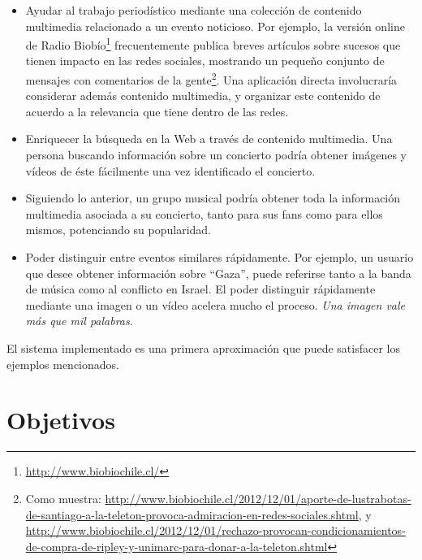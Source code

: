 \documentclass[upright, contnum]{umemoria}
\begin{document}
\begin{itemize}
\item Ayudar al trabajo periodístico mediante una colección de
     contenido multimedia relacionado a un evento noticioso. Por
     ejemplo, la versión online de Radio
     Biobío\footnote{\href{http://www.biobiochile.cl/}{http://www.biobiochile.cl/} } frecuentemente publica
     breves artículos sobre sucesos que tienen impacto en las redes
     sociales, mostrando un pequeño conjunto de mensajes con
     comentarios de la gente\footnote{Como muestra: \href{http://www.biobiochile.cl/2012/12/01/aporte-de-lustrabotas-de-santiago-a-la-teleton-provoca-admiracion-en-redes-sociales.shtml}{http://www.biobiochile.cl/2012/12/01/aporte-de-lustrabotas-de-santiago-a-la-teleton-provoca-admiracion-en-redes-sociales.shtml}, y \href{http://www.biobiochile.cl/2012/12/01/rechazo-provocan-condicionamientos-de-compra-de-ripley-y-unimarc-para-donar-a-la-teleton.shtml}{http://www.biobiochile.cl/2012/12/01/rechazo-provocan-condicionamientos-de-compra-de-ripley-y-unimarc-para-donar-a-la-teleton.shtml} }. 
     Una aplicación directa involucraría
     considerar además contenido multimedia, y organizar este
     contenido de acuerdo a la relevancia que tiene dentro de las
     redes.
\item Enriquecer la búsqueda en la Web a través de contenido
     multimedia. Una persona buscando información sobre un concierto
     podría obtener imágenes y vídeos de éste fácilmente una vez
     identificado el concierto.
\item Siguiendo lo anterior, un grupo musical podría obtener toda la
     información multimedia asociada a su concierto, tanto para sus
     fans como para ellos mismos, potenciando su popularidad.
\item Poder distinguir entre eventos similares rápidamente. Por
     ejemplo, un usuario que desee obtener información sobre ``Gaza'',
     puede referirse tanto a la banda de música como al conflicto en
     Israel. El poder distinguir rápidamente mediante una imagen o un
     vídeo acelera mucho el proceso. \emph{Una imagen vale más que mil palabras}.
\end{itemize}
   El sistema implementado es una primera aproximación que puede
   satisfacer los ejemplos mencionados.

\section{Objetivos}
\label{sec-1.2}
\end{document}
